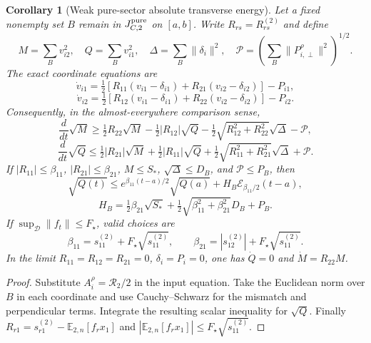 \documentclass{article} %
\theoremstyle{plain}
\newtheorem{corollary}[theorem]{Corollary}
\theoremstyle{definition}
\theoremstyle{remark}
\begin{document}
\begin{corollary}[Weak pure-sector absolute transverse energy]
\label{sbagg:weak-Q}
Let a fixed nonempty set $B$ remain in $J_{C,2}^{\rm pure}$ on $[a,b]$.
Write $R_{rs}=R_{rs}^{(2)}$ and define
\[
 M=\sum_{B}v_{i2}^2,\quad Q=\sum_Bv_{i1}^2,\quad
 \Delta=\sum_B\|\delta_i\|^2,\quad
 \mathcal P=\left(\sum_B\|P_{i,\perp}^\rho\|^2\right)^{1/2}.
\]
The exact coordinate equations are
\[
 \dot v_{i1}=\tfrac12[R_{11}(v_{i1}-\delta_{i1})
                       +R_{21}(v_{i2}-\delta_{i2})]-P_{i1},
\]
\[
 \dot v_{i2}=\tfrac12[R_{12}(v_{i1}-\delta_{i1})
                       +R_{22}(v_{i2}-\delta_{i2})]-P_{i2}.
\]
Consequently, in the almost-everywhere comparison sense,
\[
 \frac{d}{dt}\sqrt M\ge
 \tfrac12R_{22}\sqrt M-\tfrac12|R_{12}|\sqrt Q
 -\tfrac12\sqrt{R_{12}^2+R_{22}^2}\sqrt\Delta-\mathcal P,
\]
\[
 \frac{d}{dt}\sqrt Q\le
 \tfrac12|R_{21}|\sqrt M+\tfrac12|R_{11}|\sqrt Q
 +\tfrac12\sqrt{R_{11}^2+R_{21}^2}\sqrt\Delta+\mathcal P.
\]
If $|R_{11}|\le\beta_{11}$, $|R_{21}|\le\beta_{21}$,
$M\le S_*$, $\sqrt\Delta\le D_B$, and $\mathcal P\le P_B$, then
\[
 \sqrt{Q(t)}\le e^{\beta_{11}(t-a)/2}\sqrt{Q(a)}
       +H_B\mathcal E_{\beta_{11}/2}(t-a),
\]
\[
 H_B=\tfrac12\beta_{21}\sqrt{S_*}
      +\tfrac12\sqrt{\beta_{11}^2+\beta_{21}^2}D_B+P_B.
\]
If $\sup_{\mathcal D}\|f_t\|\le F_\star$, valid choices are
\[
 \beta_{11}=s_{11}^{(2)}+F_\star\sqrt{s_{11}^{(2)}},\qquad
 \beta_{21}=|s_{12}^{(2)}|+F_\star\sqrt{s_{11}^{(2)}}.
\]
In the limit $R_{11}=R_{12}=R_{21}=0$, $\delta_i=P_i=0$,
one has $\dot Q=0$ and $\dot M=R_{22}M$.
\end{corollary}
\begin{proof}
Substitute $A_i^\rho=\mathcal R_2/2$ in the input equation. Take the
Euclidean norm over $B$ in each coordinate and use Cauchy--Schwarz for
the mismatch and perpendicular terms. Integrate the resulting scalar
inequality for $\sqrt Q$. Finally
$R_{r1}=s_{r1}^{(2)}-\mathbb E_{2,n}[f_r x_1]$ and
$|\mathbb E_{2,n}[f_r x_1]|\le F_\star\sqrt{s_{11}^{(2)}}$.
\end{proof}
\end{document}

